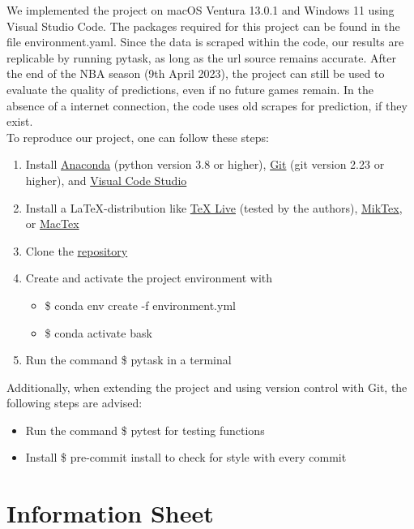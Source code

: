 \documentclass[11pt, a4paper, leqno]{article}
\begin{document}
We implemented the project on macOS Ventura 13.0.1 and Windows 11 using Visual Studio Code. The packages required for this project can be found in the file environment.yaml.
Since the data is scraped within the code, our results are replicable by running pytask, as long as the url source remains accurate.
After the end of the NBA season (9th April 2023), the project can still be used to evaluate the quality of predictions, even if no future games remain.
In the absence of a internet connection, the code uses old scrapes for prediction, if they exist.
\\
To reproduce our project, one can follow these steps:
\begin{enumerate}
    \item Install \href{https://docs.anaconda.com/anaconda/install/index.html}{Anaconda} (python version 3.8 or higher), \href{https://git-scm.com/}{Git} (git version 2.23 or higher), and \href{https://code.visualstudio.com/download}{Visual Code Studio}
    \item Install a \LaTeX-distribution like  \href{https://www.tug.org/texlive/}{TeX Live} (tested by the authors), \href{https://miktex.org/}{MikTex}, or \href{https://tug.org/mactex/}{MacTex}
    \item Clone the \href{https://github.com/NormProgr/basketball_predict}{repository}
    \item Create and activate the project environment with
        \begin{itemize}
            \item \$ conda env create -f environment.yml
            \item \$ conda activate bask
        \end{itemize}
    \item Run the command \$ pytask in a terminal
\end{enumerate}

Additionally, when extending the project and using version control with Git, the following steps are advised:
\begin{itemize}
    \item Run the command \$ pytest for testing functions
    \item Install \$ pre-commit install to check for style with every commit
\end{itemize}

\clearpage
\section{Information Sheet}
\end{document}
